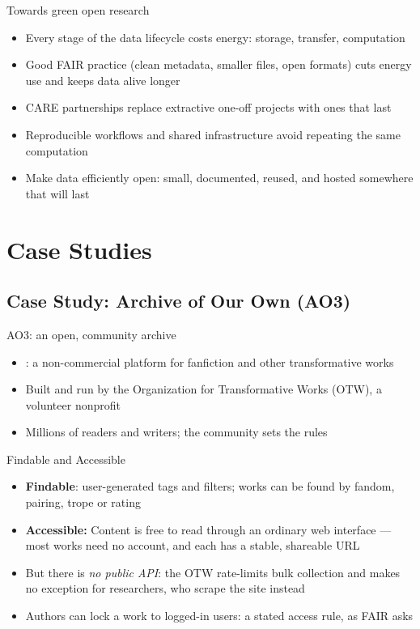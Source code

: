\documentclass[aspectratio=169]{beamer}
\begin{document}
\begin{frame}{Towards green open research}
\begin{itemize}
  \item Every stage of the data lifecycle costs energy: storage, transfer, computation
  \item Good FAIR practice (clean metadata, smaller files, open formats) cuts energy use and keeps data alive longer
  \item CARE partnerships replace extractive one-off projects with ones that last
  \item Reproducible workflows and shared infrastructure avoid repeating the same computation
  \item Make data efficiently open: small, documented, reused, and hosted somewhere that will last
\end{itemize}
\end{frame}


\section{Case Studies}

\subsection{Case Study: Archive of Our Own (AO3)}

\begin{frame}{AO3: an open, community archive}
\begin{itemize}
  \item \href{https://archiveofourown.org/}{}: a non-commercial platform for fanfiction and other transformative works
  \item Built and run by the Organization for Transformative Works (OTW), a volunteer nonprofit
  \item Millions of readers and writers; the community sets the rules
\end{itemize}
\end{frame}

\begin{frame}{Findable and Accessible}
\begin{itemize}
  \item \textbf{Findable}: user-generated tags and filters; works can be found by fandom, pairing, trope or rating
  \item \textbf{Accessible:} Content is free to read through an ordinary web interface --- most works need no account, and each has a stable, shareable URL
  \item But there is \emph{no public API}: the OTW rate-limits bulk collection and makes no exception for researchers, who scrape the site instead
  \item Authors can lock a work to logged-in users: a stated access rule, as FAIR asks
\end{itemize}
\end{frame}
\end{document}
